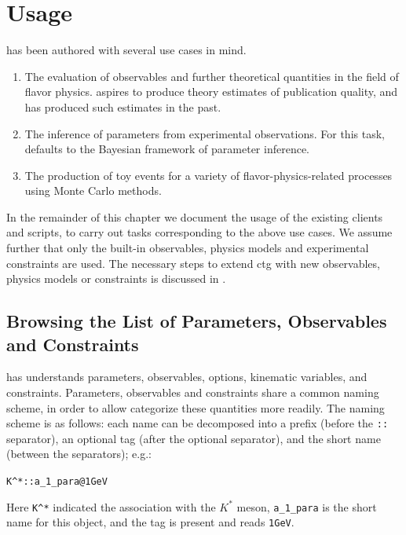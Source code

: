
\chapter{Usage}
\label{ch:usage}

\ctg has been authored with several use cases in mind.
\begin{enumerate}
\item The evaluation of observables and further theoretical quantities in the
field of flavor physics. \ctg aspires to produce theory estimates of publication
quality, and has produced such estimates in the past.

\item The inference of parameters from experimental observations.  For this
task, \ctg defaults to the Bayesian framework of parameter inference.

\item The production of toy events for a variety of flavor-physics-related
processes using Monte Carlo methods.
\end{enumerate}

In the remainder of this chapter we document the usage of the existing \ctg
clients and scripts, to carry out tasks corresponding to the above use
cases. We assume further that only the built-in observables, physics models
and experimental constraints are used. The necessary steps to extend ctg with
new observables, physics models or constraints is discussed in .


\section{Browsing the List of Parameters, Observables and Constraints}
\label{sec:usage:parameters+observables+constraints}

\ctg has understands parameters, observables, options, kinematic variables, and
constraints.  Parameters, observables and constraints share a common naming
scheme, in order to allow categorize these quantities more readily. The naming
scheme is as follows: each name can be decomposed into a prefix (before the
\texttt{::} separator), an optional tag (after the optional \texttt{\@}
separator), and the short name (between the separators); e.g.:
\begin{center}
    \verb+K^*::a_1_para@1GeV+
\end{center}
Here \texttt{K\^{}*} indicated the association with the $K^*$ meson,
\texttt{a\_1\_para} is the short name for this object, and the tag is present and
reads \texttt{1GeV}.\\

